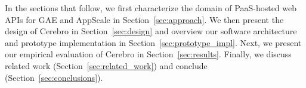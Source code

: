 
In the sections that follow, we first characterize the domain of 
PaaS-hosted web APIs for GAE and AppScale 
in Section~\ref{sec:approach}.   
We then present the design of Cerebro in Section~\ref{sec:design}
and overview our software architecture and prototype implementation
in Section~\ref{sec:prototype_impl}.
Next, we
present our empirical evaluation of Cerebro in 
Section~\ref{sec:results}.
Finally,  we discuss related work (Section~\ref{sec:related_work}) and 
conclude (Section~\ref{sec:conclusions}).
